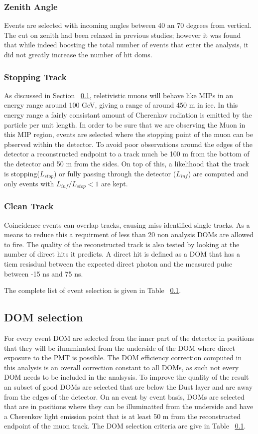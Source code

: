 \documentclass[a4paper,onecolumn, 12pt]{article}
\begin{document}
\subsubsection{Zenith Angle}
Events are selected with incoming angles between 40 an 70 degrees from vertical. The cut on zenith had been relaxed in previous studies; however it was found that while indeed boosting the total number of events that enter the analysis, it did not greatly increase the number of hit doms. 

\subsubsection{Stopping Track}
As discussed in Section ~\ref{}, reletivistic muons will behave like MIPs in an energy range around 100 GeV, giving a range of around 450 m in ice. In this energy range a fairly consistant amount of Cherenkov radiation is emitted by the particle per unit length. In order to be sure that we are observing the Muon in this MIP region, events are selected where the stopping point of the muon can be pbserved within the detector. To avoid poor observations around the edges of the detector a reconstructed endpoint to a track much be 100 m from the bottom of the detector and 50 m from the sides. On top of this, a likelihood that the track is stopping($L_{stop}$) or fully passing through the detector ($L_{inf}$) are computed and only events with $L_{inf}/L_{stop} < 1$ are kept.

\subsubsection{Clean Track}
Coincidence events can overlap tracks, causing miss identified single tracks. As a means to reduce this a requirment of less than 20 non analysis DOMs are allowed to fire. The quality of the reconstructed track is also tested by looking at the number of direct hits it predicts. A direct hit is defined as a DOM that has a tiem resisdual between the expected direct photon and the measured pulse between -15 ns and 75 ns.

The complete list of event selection is given in Table ~\ref{}.

\subsection{DOM selection}
For every event DOM are selected from the inner part of the detector in  positions that they will be ilumminated from the underside of the DOM where direct exposure to the PMT is possible. The DOM efficiency correction computed in this analysis is an overall correction constant to all DOMs, as such not every DOM needs to be included in the analsysis. To improve the quality of the result an subset of good DOMs are selected that are below the Dust layer and are away from the edges of the detector. On an event by event basis, DOMs are selected that are in positions where they can be illuminatted from the underside and have a Cherenkov light emission point that is at least 50 m from the reconstructed endpoint of the muon track. The DOM selection criteria are give in Table ~\ref{}.
\end{document}

